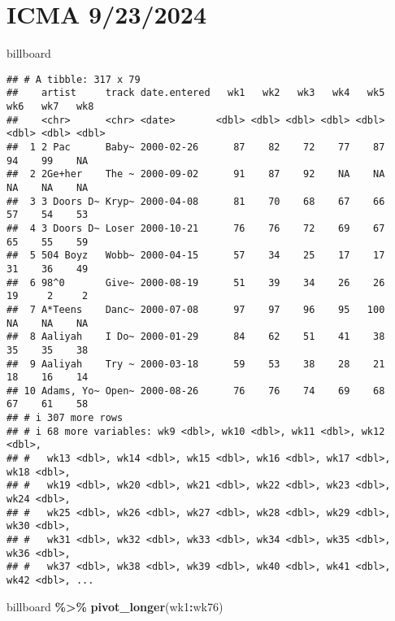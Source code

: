 \documentclass[
]{article}
\newenvironment{Shaded}{\begin{snugshade}}{\end{snugshade}}
\newcommand{\FunctionTok}[1]{\textcolor[rgb]{0.13,0.29,0.53}{\textbf{#1}}}
\newcommand{\NormalTok}[1]{#1}
\newcommand{\SpecialCharTok}[1]{\textcolor[rgb]{0.81,0.36,0.00}{\textbf{#1}}}
\begin{document}
\section{ICMA 9/23/2024}\label{icma-9232024}

\begin{Shaded}
\begin{Highlighting}[]
\NormalTok{billboard}
\end{Highlighting}
\end{Shaded}

\begin{verbatim}
## # A tibble: 317 x 79
##    artist     track date.entered   wk1   wk2   wk3   wk4   wk5   wk6   wk7   wk8
##    <chr>      <chr> <date>       <dbl> <dbl> <dbl> <dbl> <dbl> <dbl> <dbl> <dbl>
##  1 2 Pac      Baby~ 2000-02-26      87    82    72    77    87    94    99    NA
##  2 2Ge+her    The ~ 2000-09-02      91    87    92    NA    NA    NA    NA    NA
##  3 3 Doors D~ Kryp~ 2000-04-08      81    70    68    67    66    57    54    53
##  4 3 Doors D~ Loser 2000-10-21      76    76    72    69    67    65    55    59
##  5 504 Boyz   Wobb~ 2000-04-15      57    34    25    17    17    31    36    49
##  6 98^0       Give~ 2000-08-19      51    39    34    26    26    19     2     2
##  7 A*Teens    Danc~ 2000-07-08      97    97    96    95   100    NA    NA    NA
##  8 Aaliyah    I Do~ 2000-01-29      84    62    51    41    38    35    35    38
##  9 Aaliyah    Try ~ 2000-03-18      59    53    38    28    21    18    16    14
## 10 Adams, Yo~ Open~ 2000-08-26      76    76    74    69    68    67    61    58
## # i 307 more rows
## # i 68 more variables: wk9 <dbl>, wk10 <dbl>, wk11 <dbl>, wk12 <dbl>,
## #   wk13 <dbl>, wk14 <dbl>, wk15 <dbl>, wk16 <dbl>, wk17 <dbl>, wk18 <dbl>,
## #   wk19 <dbl>, wk20 <dbl>, wk21 <dbl>, wk22 <dbl>, wk23 <dbl>, wk24 <dbl>,
## #   wk25 <dbl>, wk26 <dbl>, wk27 <dbl>, wk28 <dbl>, wk29 <dbl>, wk30 <dbl>,
## #   wk31 <dbl>, wk32 <dbl>, wk33 <dbl>, wk34 <dbl>, wk35 <dbl>, wk36 <dbl>,
## #   wk37 <dbl>, wk38 <dbl>, wk39 <dbl>, wk40 <dbl>, wk41 <dbl>, wk42 <dbl>, ...
\end{verbatim}

\begin{Shaded}
\begin{Highlighting}[]
\NormalTok{billboard }\SpecialCharTok{\%\textgreater{}\%} 
  \FunctionTok{pivot\_longer}\NormalTok{(wk1}\SpecialCharTok{:}\NormalTok{wk76)}
\end{Highlighting}
\end{Shaded}
\end{document}
